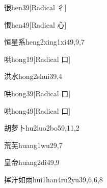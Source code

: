 \begin{verbete}{很}{hen3}{9}[Radical 彳]
\end{verbete}

\begin{verbete}{恨}{hen4}{9}[Radical 心]
\end{verbete}

\begin{verbete}{恒星系}{heng2xing1xi4}{9,9,7}
\end{verbete}

\begin{verbete}{哄}{hong1}{9}[Radical 口]
\end{verbete}

\begin{verbete}{洪水}{hong2shui3}{9,4}
\end{verbete}

\begin{verbete}{哄}{hong3}{9}[Radical 口]
\end{verbete}

\begin{verbete}{哄}{hong4}{9}[Radical 口]
\end{verbete}

\begin{verbete}{胡萝卜}{hu2luo2bo5}{9,11,2}
\end{verbete}

\begin{verbete}{荒芜}{huang1wu2}{9,7}
\end{verbete}

\begin{verbete}{皇帝}{huang2di4}{9,9}
\end{verbete}

\begin{verbete}{挥汗如雨}{hui1han4ru2yu3}{9,6,6,8}
\end{verbete}

